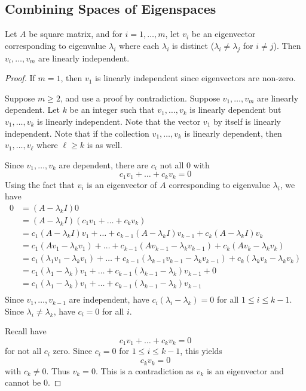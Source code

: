 \documentclass{article}
\begin{document}
    \subsection{Combining Spaces of Eigenspaces}
    \begin{theorem}
      Let $A$ be square matrix, and for $i = 1, \ldots, m$, let $v_i$ be an eigenvector corresponding to eigenvalue $\lambda_i$ where each $\lambda_i$ is distinct ($\lambda_i \neq \lambda_j$ for $i \neq j$). Then $v_i, \ldots, v_m$ are linearly independent.
    \end{theorem}
    \begin{proof}
      If $m = 1$, then $v_1$ is linearly independent since eigenvectors are non-zero.

      Suppose $m \geq 2$, and use a proof by contradiction. Suppose $v_1, \ldots, v_m$ are linearly dependent. Let $k$ be an integer such that $v_1, \ldots, v_k$ is linearly dependent but $v_1, \ldots, v_k$ is linearly independent. Note that the vector $v_1$ by itself is linearly independent. Note that if the collection $v_1, \ldots, v_k$ is linearly dependent, then $v_1, \ldots, v_\ell$ where $\ell \geq k$ is as well.

      Since $v_1, \ldots, v_k$ are dependent, there are $c_i$ not all $0$ with \[
        c_1v_1 + \dots + c_kv_k = 0
      \]
      Using the fact that $v_i$ is an eigenvector of $A$ corresponding to eigenvalue $\lambda_i$, we have
      \begin{align*}
        0 &= (A - \lambda_kI)0\\
        &= (A - \lambda_kI)(c_1v_1 + \dots + c_kv_k)\\
        &= c_1(A - \lambda_kI)v_1 + \dots + c_{k-1}(A - \lambda_kI)v_{k-1} + c_k(A - \lambda_kI)v_k\\
        &= c_1(Av_1 - \lambda_kv_1) + \dots + c_{k-1}(Av_{k-1} - \lambda_kv_{k-1}) + c_k(Av_k - \lambda_kv_k)\\
        &= c_1(\lambda_1v_1 - \lambda_kv_1) + \dots + c_{k-1}(\lambda_{k-1}v_{k-1} - \lambda_kv_{k-1}) + c_k(\lambda_kv_k - \lambda_kv_k)\\
        &= c_1(\lambda_1 - \lambda_k)v_1 + \dots + c_{k-1}(\lambda_{k-1} - \lambda_k)v_{k-1} + 0\\
        &= c_1(\lambda_1 - \lambda_k)v_1 + \dots + c_{k-1}(\lambda_{k-1} - \lambda_k)v_{k-1}\\
      \end{align*}
      Since $v_1, \ldots, v_{k-1}$ are independent, have $c_i(\lambda_i - \lambda_k) = 0$ for all $1 \leq i \leq k-1$. Since $\lambda_i \neq \lambda_k$, have $c_i = 0$ for all $i$.

      Recall have \[
        c_1v_1 + \dots + c_kv_k = 0
      \] for not all $c_i$ zero. Since $c_i = 0$ for $1 \leq i \leq k-1$, this yields \[
        c_kv_k = 0
      \] with $c_k \neq 0$. Thus $v_k = 0$. This is a contradiction as $v_k$ is an eigenvector and cannot be $0$.
    \end{proof}
\end{document}
